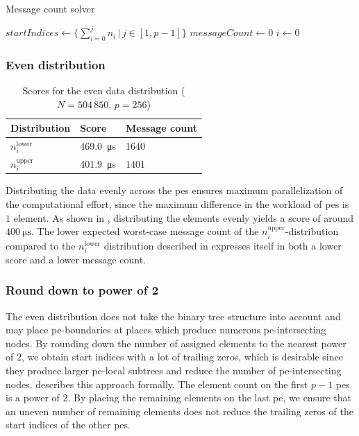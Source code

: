 \begin{algorithm}
\caption{Message count solver}\label{algo:MessageCountSolver}
\DontPrintSemicolon
\SetAlgoLined
$startIndices \gets \{\sum_{i=0}^j n_i \,\big|\, j \in [1, p-1] \}$\;
$messageCount \gets 0$\;
$i \gets 0$\; 
\end{algorithm}



\subsubsection{Even distribution}

\begin{table}
\centering
\caption{Scores for the even data distribution ($N = 504\,850$, $p=256$)}
\label{table:EvenDistributionScores}
\begin{tabular}{l|l|l}
Distribution & Score & Message count \\
\hline
$n_i^\textrm{lower}$ & \SI{469.0}{\micro\second} & 1640 \\
$n_i^\textrm{upper}$ & \SI{401.9}{\micro\second} & 1401
\end{tabular}
\end{table}
Distributing the data evenly across the \glspl{pe} ensures maximum parallelization of the computational effort, since the maximum difference in the workload of \glspl{pe} is $1$ element.
As shown in , distributing the elements evenly yields a score of around $\SI{400}{\micro\second}$.
The lower expected worst-case message count of the $n_i^\textrm{upper}$-distribution compared to the $n_i^\textrm{lower}$ distribution described in  expresses itself in both a lower score and a lower message count.

\subsubsection{Round down to power of 2}
\label{sec:roundDownPower2Distribution}
The even distribution does not take the binary tree structure into account and may place \gls{pe}-boundaries at places which produce numerous \gls{pe}-intersecting nodes.
By rounding down the number of assigned elements to the nearest power of $2$, we obtain start indices with a lot of trailing zeros, which is desirable since they produce larger \gls{pe}-local subtrees and reduce the number of \gls{pe}-intersecting nodes.
 describes this approach formally.
The element count on the first $p - 1$ \glspl{pe} is a power of $2$.
By placing the remaining elements on the last \gls{pe}, we ensure that an uneven number of remaining elements does not reduce the trailing zeros of the start indices of the other \glspl{pe}.

